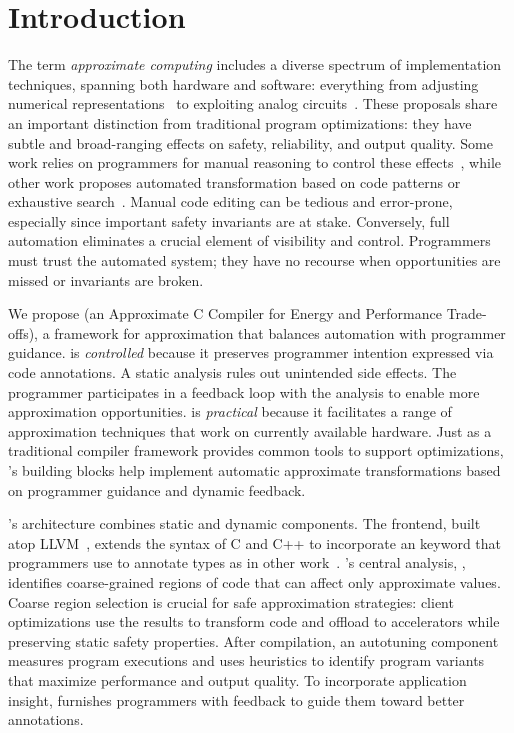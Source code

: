 \section{Introduction}\label{accept:sec:intro}

The term \emph{approximate computing} includes a diverse spectrum of
implementation techniques, spanning both hardware and software:
everything from adjusting numerical representations~\cite{precimonious}
to exploiting analog circuits~\cite{anpu}.
These proposals share an important distinction
from traditional program optimizations:
they have subtle and broad-ranging effects on safety, reliability, and output
quality.
Some work relies on programmers for manual reasoning to control
these
effects~\cite{npu, flikker, races-ibm, perforation},
while other work proposes automated transformation based on code
patterns or exhaustive search~\cite{green, paraprox, sage}.
Manual code editing can be tedious and error-prone, especially since
important safety invariants are at stake.
Conversely, full automation eliminates a crucial element of
visibility and control.
Programmers must trust the automated system; they have no recourse when
opportunities are missed or invariants are broken.

We propose \sysname
(an Approximate C Compiler for Energy and Performance Trade-offs),
a framework for approximation that balances automation with programmer
guidance.
\sysname is \emph{controlled} because it preserves programmer intention
expressed via code annotations.
A static analysis rules out
unintended side effects. The programmer participates in a feedback loop with
the analysis to enable more approximation
opportunities.
\sysname is \emph{practical} because it facilitates a range
of approximation techniques that work on currently available hardware.
Just as a traditional compiler framework provides common tools to support
optimizations,
\sysname's building blocks help implement automatic
approximate transformations based on programmer guidance and dynamic feedback.

\sysname's architecture combines static and dynamic components.
The frontend, built atop LLVM~\cite{llvm}, extends the syntax of C and C++ to
incorporate an  keyword that programmers use to annotate types as
in other work~\cite{enerj}.
\sysname's central analysis, \emph{\precisepurity}, identifies coarse-grained
regions of code that can
affect only approximate values.
Coarse region selection is crucial for safe approximation strategies:
client optimizations use the results to
transform code and offload to accelerators while preserving static safety
properties.
After compilation, an autotuning component measures program executions
and uses heuristics to identify program variants that maximize performance and output quality.
To incorporate application insight, \sysname furnishes programmers with feedback
to guide them toward better annotations.


